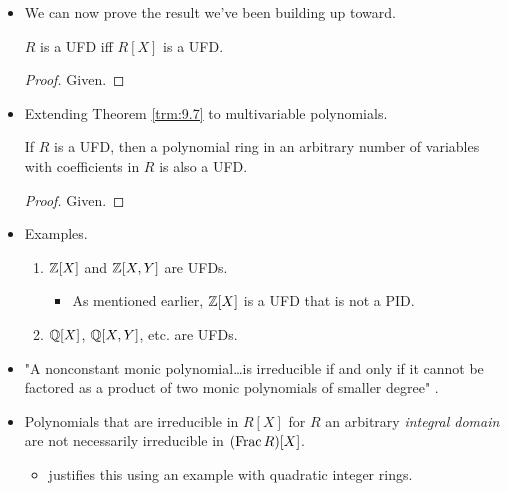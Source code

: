 \documentclass[../notes.tex]{subfiles}
\begin{document}
\begin{itemize}
\begin{corollary}
\begin{proof}
            We prove this claim via double contrapositives.\par
            Suppose first that $p$ is reducible in $F[X]$. Then by \hyperref[prp:9.5]{Gauss' Lemma}, $p$ is reducible in $R[X]$.\par
            Now suppose that $p$ is reducible in $R[X]$. Then $p=ab$ for some $a,b\in R[X]$. Moreover, neither $a$ nor $b$ is constant as if (say $a$) were, then the assumption that the gcd of its coefficients is 1 would imply that $a=1$, itself, i.e., $a$ is a unit, contradicting the statement that $ab$ is a factorization of $p$. This same factorization proves that $p$ is reducible in $F$.
        \end{proof}
    \end{corollary}
    \item We can now prove the result we've been building up toward.
    \begin{theorem}\label{trm:9.7}
        $R$ is a UFD iff $R[X]$ is a UFD.
        \begin{proof}
            Given.
        \end{proof}
    \end{theorem}
    \item Extending Theorem \ref{trm:9.7} to multivariable polynomials.
    \begin{corollary}\label{cly:9.8}
        If $R$ is a UFD, then a polynomial ring in an arbitrary number of variables with coefficients in $R$ is also a UFD.
        \begin{proof}
            Given.
        \end{proof}
    \end{corollary}
    \item Examples.
    \begin{enumerate}
        \item $\mathbb{Z}[X]$ and $\mathbb{Z}[X,Y]$ are UFDs.
        \begin{itemize}
            \item As mentioned earlier, $\mathbb{Z}[X]$ is a UFD that is not a PID.
        \end{itemize}
        \item $\mathbb{Q}[X]$, $\mathbb{Q}[X,Y]$, etc. are UFDs.
    \end{enumerate}
    \item "A nonconstant monic polynomial\dots is irreducible if and only if it cannot be factored as a product of two monic polynomials of smaller degree" \parencite[306]{bib:DummitFoote}.
    \item Polynomials that are irreducible in $R[X]$ for $R$ an arbitrary \emph{integral domain} are not necessarily irreducible in $(\operatorname{Frac} R)[X]$.
    \begin{itemize}
        \item \textcite{bib:DummitFoote} justifies this using an example with quadratic integer rings.
    \end{itemize}
\end{itemize}
\end{document}
